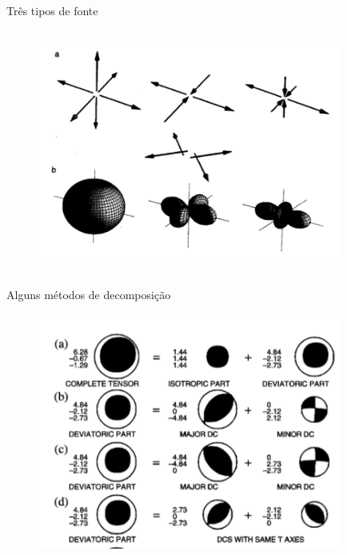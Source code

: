 \documentclass{beamer}
\begin{document}
\begin{frame}{Três tipos de fonte}
	\begin{figure}[htb]
		\centering
		\includegraphics[width= 10cm, height= 8cm]{fig21}
	\end{figure}
\end{frame}


\begin{frame}{Alguns métodos de decomposição}
	\begin{figure}[htb]
		\centering
		\includegraphics[width= 10cm, height= 8cm]{fig31}
	\end{figure}
\end{frame}
\end{document}
